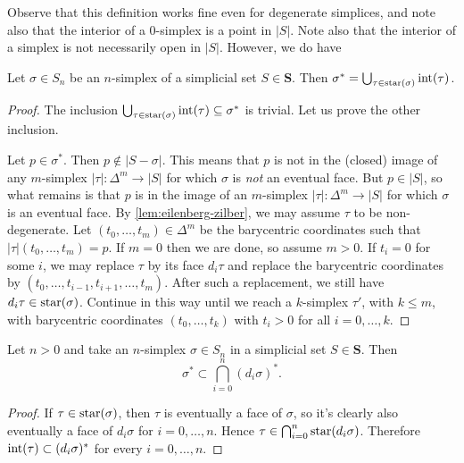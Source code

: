 Observe that this definition works fine even for degenerate simplices, and note also that the interior of a $0$-simplex is a point in $|S|$. Note also that the interior of a simplex is not necessarily open in $|S|$. However, we do have

\begin{lemma}
\label{lem:realization of the star is union of the interiors}
Let $\sigma \in S_n$ be an $n$-simplex of a simplicial set $S \in \mathbf{S}$. Then $\sigma^* = \bigcup_{\tau \in \operatorname{star}(\sigma)} \operatorname{int}(\tau)$.
\end{lemma}
\begin{proof}
The inclusion $\bigcup_{\tau \in \operatorname{star}(\sigma)} \operatorname{int}(\tau) \subseteq \sigma^*$ is trivial. Let us prove the other inclusion.

Let $p \in \sigma^*$. Then $p \not\in |S-\sigma|$. This means that $p$ is not in the (closed) image of any $m$-simplex $|\tau| : \Delta^m \to |S|$ for which $\sigma$ is \emph{not} an eventual face. 
But $p \in |S|$, so what remains is that $p$ is in the image of an $m$-simplex $|\tau| : \Delta^m \to |S|$ for which $\sigma$ is an eventual face. 
By \cref{lem:eilenberg-zilber}, we may assume $\tau$ to be non-degenerate. 
Let $(t_0,\ldots,t_m) \in \Delta^m$ be the barycentric coordinates such that $|\tau|(t_0,\ldots,t_m) = p$. 
If $m=0$ then we are done, so assume $m>0$. If $t_i = 0$ for some $i$, we may replace $\tau$ by its face $d_i \tau$ and replace the barycentric coordinates by $(t_0,\ldots,t_{i-1},t_{i+1},\ldots,t_m)$. After such a replacement, we still have $d_i \tau \in \operatorname{star}(\sigma)$. 
Continue in this way until we reach a $k$-simplex $\tau'$, with $k \leq m$, with barycentric coordinates $(t_0,\ldots,t_k)$ with $t_i > 0$ for all $i=0,\ldots,k$. 

\end{proof}

\begin{lemma}
\label{lem:realization of the star is contained in the intersection of the realizations of its faces}
Let $n>0$ and take an $n$-simplex $\sigma \in S_n$ in a simplicial set $S \in \mathbf{S}$. Then
\[ \sigma^* \subset \bigcap_{i=0}^n (d_i \sigma)^*. \]
\end{lemma}
\begin{proof}
If $\tau \in \operatorname{star}(\sigma)$, then $\tau$ is eventually a face of $\sigma$, so it's clearly also eventually a face of $d_i \sigma$ for $i=0,\ldots,n$. Hence $\tau \in \bigcap_{i=0}^n \operatorname{star}(d_i \sigma)$. Therefore $\operatorname{int}(\tau) \subset (d_i \sigma)^*$ for every $i=0,\ldots,n$.
\end{proof}

